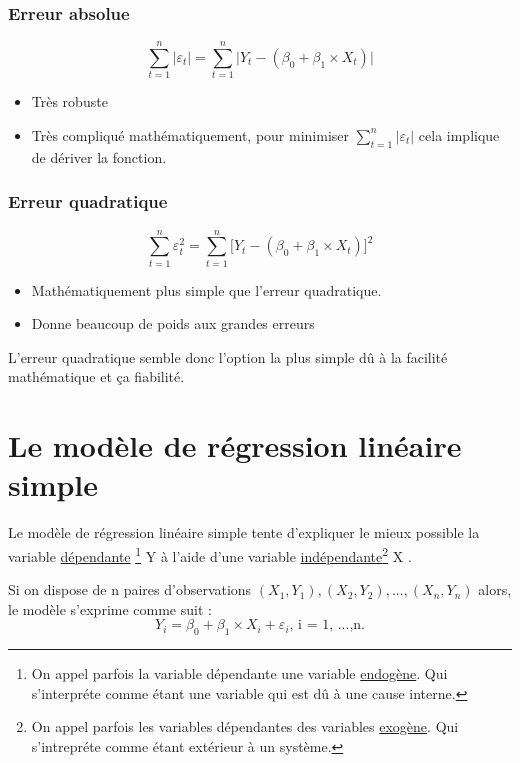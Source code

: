 \documentclass[11pt,french]{report}
\begin{document}
\subsubsection{Erreur absolue}
\begin{equation}
\sum_{t=1}^n |\varepsilon_t| = \sum_{t=1}^n \Big| Y_t - (\beta_0 + \beta_1\times X_t) \Big| 
\end{equation}
\begin{itemize}
\item Très robuste
\item Très compliqué mathématiquement, pour minimiser $\sum_{t=1}^n |\varepsilon_t|$ cela implique de dériver la fonction.
\end{itemize}

\subsubsection{Erreur quadratique}
\begin{equation}
\sum_{t=1}^n \varepsilon_t^2 = \sum_{t=1}^n \Big[ Y_t - (\beta_0 + \beta_1\times X_t) \Big]^2 
\end{equation}
\begin{itemize}
\item Mathématiquement plus simple que l'erreur quadratique.
\item Donne beaucoup de poids aux grandes erreurs
\end{itemize}

\bigskip
L'erreur quadratique semble donc l'option la plus simple dû à la facilité mathématique et ça fiabilité.

\section{Le modèle de régression linéaire simple}
Le modèle de régression linéaire simple tente d'expliquer le mieux possible la variable \href{https://fr.wikipedia.org/wiki/Variable_dépendante}{dépendante} \footnote{On appel parfois la variable dépendante une variable \href{https://fr.wikipedia.org/wiki/Endogène}{endogène}. Qui s'interpréte comme étant une variable qui est dû à une cause interne.}  Y à l'aide d'une variable \href{https://fr.wikipedia.org/wiki/Variable_indépendante}{indépendante}\footnote{On appel parfois les variables dépendantes des variables \href{https://fr.wikipedia.org/wiki/Exogène}{exogène}. Qui s'intrepréte comme étant extérieur à un système.} X . 

Si on dispose de n paires d'observations $(X_1, Y_1), (X_2, Y_2),...,(X_n, Y_n)$ alors, le modèle s'exprime  comme suit :
\begin{equation}
\label{eq:simple}
Y_i = \beta_0 + \beta_1\times X_i + \varepsilon_i \text{,  i = 1, ...,n.}
\end{equation}
\end{document}
